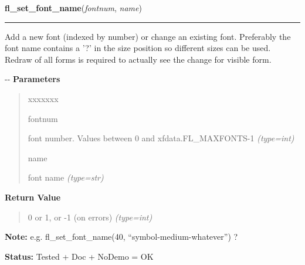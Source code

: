     \label{xformslib:flbasic:fl_set_font_name}

    \vspace{0.5ex}

\hspace{.8\funcindent}\begin{boxedminipage}{\funcwidth}

    \raggedright \textbf{fl\_set\_font\_name}(\textit{fontnum}, \textit{name})

    \vspace{-1.5ex}

    \rule{\textwidth}{0.5\fboxrule}
\setlength{\parskip}{2ex}

Add a new font (indexed by number) or change an existing font.
Preferably the font name contains a '?' in the size position so different
sizes can be used. Redraw of all forms is required to actually see the
change for visible form.

-{}-
\setlength{\parskip}{1ex}
      \textbf{Parameters}
      \vspace{-1ex}

      \begin{quote}
        \begin{Ventry}{xxxxxxx}

          \item[fontnum]


font number. Values between 0 and xfdata.FL\_MAXFONTS-1
            {\it (type=int)}

          \item[name]


font name
            {\it (type=str)}

        \end{Ventry}

      \end{quote}

      \textbf{Return Value}
    \vspace{-1ex}

      \begin{quote}

0 or 1, or -1 (on errors)
      {\it (type=int)}

      \end{quote}

\textbf{Note:} 
e.g. fl\_set\_font\_name(40, ``symbol-medium-whatever'') ?


\textbf{Status:} 
Tested + Doc + NoDemo = OK


    \end{boxedminipage}

